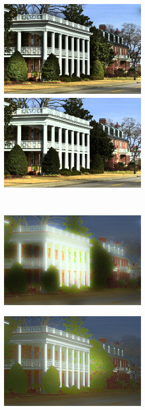 \begin{figure}[t]
\centering
	\begin{minipage}[b]{0.49\hsize}
		\centering
		\includegraphics[width=72mm, height=48mm]{images/experiment/decomp/srie/reflectance.eps}
	\end{minipage}
	\begin{minipage}[b]{0.49\hsize}
		\centering
		\includegraphics[width=72mm, height=48mm]{images/experiment/decomp/wvm/reflectance.eps}
	\end{minipage} \\
	\vspace{1.5mm}
	\begin{minipage}[b]{0.49\hsize}
		\centering
		\includegraphics[width=72mm, height=48mm]{images/experiment/decomp/srie/illumination.eps}
		 \label{fig. decomp_srie}
	\end{minipage}
	\begin{minipage}[b]{0.49\hsize}
		\centering
		\includegraphics[width=72mm, height=48mm]{images/experiment/decomp/wvm/illumination.eps}

\end{minipage}
\end{figure}
